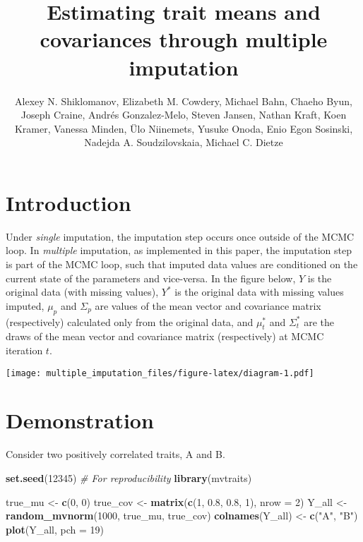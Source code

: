 \documentclass[]{article}
\title{Estimating trait means and covariances through multiple imputation}
\author{Alexey N. Shiklomanov, Elizabeth M. Cowdery, Michael Bahn, Chaeho Byun,
Joseph Craine, Andrés Gonzalez-Melo, Steven Jansen, Nathan Kraft, Koen
Kramer, Vanessa Minden, Ülo Niinemets, Yusuke Onoda, Enio Egon Sosinski,
Nadejda A. Soudzilovskaia, Michael C. Dietze}
\date{}
\newenvironment{Shaded}{\begin{snugshade}}{\end{snugshade}}
\newcommand{\CommentTok}[1]{\textcolor[rgb]{0.56,0.35,0.01}{\textit{#1}}}
\newcommand{\DataTypeTok}[1]{\textcolor[rgb]{0.13,0.29,0.53}{#1}}
\newcommand{\DecValTok}[1]{\textcolor[rgb]{0.00,0.00,0.81}{#1}}
\newcommand{\FloatTok}[1]{\textcolor[rgb]{0.00,0.00,0.81}{#1}}
\newcommand{\KeywordTok}[1]{\textcolor[rgb]{0.13,0.29,0.53}{\textbf{#1}}}
\newcommand{\NormalTok}[1]{#1}
\newcommand{\StringTok}[1]{\textcolor[rgb]{0.31,0.60,0.02}{#1}}
\begin{document}
\maketitle

\hypertarget{introduction}{%
\section{Introduction}\label{introduction}}

Under \emph{single} imputation, the imputation step occurs once outside
of the MCMC loop. In \emph{multiple} imputation, as implemented in this
paper, the imputation step is part of the MCMC loop, such that imputed
data values are conditioned on the current state of the parameters and
vice-versa. In the figure below, \(Y\) is the original data (with
missing values), \(Y^*\) is the original data with missing values
imputed, \(\mu_p\) and \(\Sigma_p\) are values of the mean vector and
covariance matrix (respectively) calculated only from the original data,
and \(\mu^*_t\) and \(\Sigma^*_t\) are the draws of the mean vector and
covariance matrix (respectively) at MCMC iteration \(t\).

\texttt{[image: multiple\_imputation\_files/figure-latex/diagram-1.pdf]}

\hypertarget{demonstration}{%
\section{Demonstration}\label{demonstration}}

Consider two positively correlated traits, A and B.

\begin{Shaded}
\begin{Highlighting}[]
\KeywordTok{set.seed}\NormalTok{(}\DecValTok{12345}\NormalTok{) }\CommentTok{# For reproducibility}
\KeywordTok{library}\NormalTok{(mvtraits)}

\NormalTok{true_mu <-}\StringTok{ }\KeywordTok{c}\NormalTok{(}\DecValTok{0}\NormalTok{, }\DecValTok{0}\NormalTok{)}
\NormalTok{true_cov <-}\StringTok{ }\KeywordTok{matrix}\NormalTok{(}\KeywordTok{c}\NormalTok{(}\DecValTok{1}\NormalTok{, }\FloatTok{0.8}\NormalTok{, }\FloatTok{0.8}\NormalTok{, }\DecValTok{1}\NormalTok{), }\DataTypeTok{nrow =} \DecValTok{2}\NormalTok{)}
\NormalTok{Y_all <-}\StringTok{ }\KeywordTok{random_mvnorm}\NormalTok{(}\DecValTok{1000}\NormalTok{, true_mu, true_cov)}
\KeywordTok{colnames}\NormalTok{(Y_all) <-}\StringTok{ }\KeywordTok{c}\NormalTok{(}\StringTok{"A"}\NormalTok{, }\StringTok{"B"}\NormalTok{)}
\KeywordTok{plot}\NormalTok{(Y_all, }\DataTypeTok{pch =} \DecValTok{19}\NormalTok{)}
\end{Highlighting}
\end{Shaded}
\end{document}
